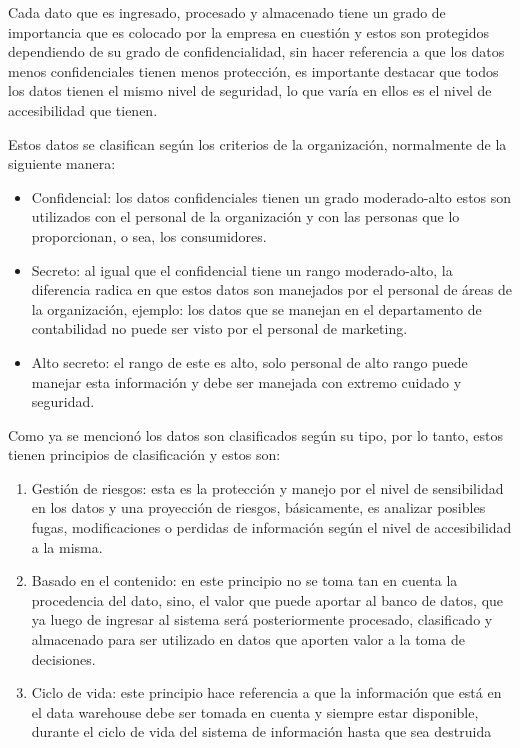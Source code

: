 \documentclass[
  letterpaper,
  DIV=11,
  numbers=noendperiod]{scrreprt}
\providecommand{\tightlist}{%
  \setlength{\itemsep}{0pt}\setlength{\parskip}{0pt}}\usepackage{longtable,booktabs,array}
\begin{document}
Cada dato que es ingresado, procesado y almacenado tiene un grado de
importancia que es colocado por la empresa en cuestión y estos son
protegidos dependiendo de su grado de confidencialidad, sin hacer
referencia a que los datos menos confidenciales tienen menos protección,
es importante destacar que todos los datos tienen el mismo nivel de
seguridad, lo que varía en ellos es el nivel de accesibilidad que
tienen.

Estos datos se clasifican según los criterios de la organización,
normalmente de la siguiente manera:

\begin{itemize}
\tightlist
\item
  Confidencial: los datos confidenciales tienen un grado moderado-alto
  estos son utilizados con el personal de la organización y con las
  personas que lo proporcionan, o sea, los consumidores.
\item
  Secreto: al igual que el confidencial tiene un rango moderado-alto, la
  diferencia radica en que estos datos son manejados por el personal de
  áreas de la organización, ejemplo: los datos que se manejan en el
  departamento de contabilidad no puede ser visto por el personal de
  marketing.
\item
  Alto secreto: el rango de este es alto, solo personal de alto rango
  puede manejar esta información y debe ser manejada con extremo cuidado
  y seguridad.
\end{itemize}

Como ya se mencionó los datos son clasificados según su tipo, por lo
tanto, estos tienen principios de clasificación y estos son:

\begin{enumerate}
\def\labelenumi{\arabic{enumi}.}
\tightlist
\item
  Gestión de riesgos: esta es la protección y manejo por el nivel de
  sensibilidad en los datos y una proyección de riesgos, básicamente, es
  analizar posibles fugas, modificaciones o perdidas de información
  según el nivel de accesibilidad a la misma.
\item
  Basado en el contenido: en este principio no se toma tan en cuenta la
  procedencia del dato, sino, el valor que puede aportar al banco de
  datos, que ya luego de ingresar al sistema será posteriormente
  procesado, clasificado y almacenado para ser utilizado en datos que
  aporten valor a la toma de decisiones.
\item
  Ciclo de vida: este principio hace referencia a que la información que
  está en el data warehouse debe ser tomada en cuenta y siempre estar
  disponible, durante el ciclo de vida del sistema de información hasta
  que sea destruida
\end{enumerate}
\end{document}
